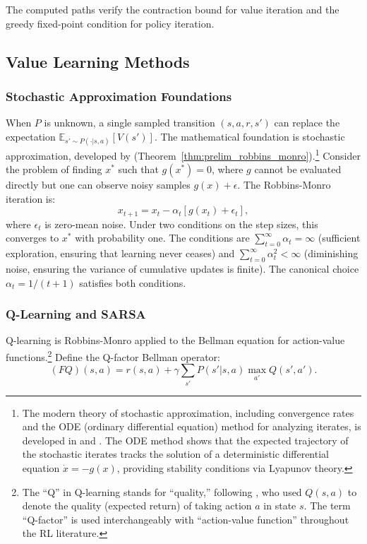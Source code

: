 The computed paths verify the contraction bound for value iteration and the greedy fixed-point condition for policy iteration.

\FloatBarrier
\subsection{Value Learning Methods}
\label{sec:stochastic_approx}

\subsubsection{Stochastic Approximation Foundations}

When $P$ is unknown, a single sampled transition $(s, a, r, s')$ can replace the expectation $\mathbb{E}_{s' \sim P(\cdot|s,a)}[V(s')]$. The mathematical foundation is stochastic approximation, developed by \citet{robbinsmonro1951} (Theorem~\ref{thm:prelim_robbins_monro}).\footnote{The modern theory of stochastic approximation, including convergence rates and the ODE (ordinary differential equation) method for analyzing iterates, is developed in \citet{kushner1978} and \citet{borkar2000}. The ODE method shows that the expected trajectory of the stochastic iterates tracks the solution of a deterministic differential equation $\dot{x} = -g(x)$, providing stability conditions via Lyapunov theory.} Consider the problem of finding $x^*$ such that $g(x^*) = 0$, where $g$ cannot be evaluated directly but one can observe noisy samples $g(x) + \epsilon$. The Robbins-Monro iteration is:
\begin{equation}
x_{t+1} = x_t - \alpha_t [g(x_t) + \epsilon_t],
\label{eq:robbins_monro}
\end{equation}
where $\epsilon_t$ is zero-mean noise. Under two conditions on the step sizes, this converges to $x^*$ with probability one. The conditions are $\sum_{t=0}^\infty \alpha_t = \infty$ (sufficient exploration, ensuring that learning never ceases) and $\sum_{t=0}^\infty \alpha_t^2 < \infty$ (diminishing noise, ensuring the variance of cumulative updates is finite). The canonical choice $\alpha_t = 1/(t+1)$ satisfies both conditions.

\subsubsection{Q-Learning and SARSA}

Q-learning \citep{WatkinsDayan1992} is Robbins-Monro applied to the Bellman equation for action-value functions.\footnote{The ``Q'' in Q-learning stands for ``quality,'' following \citet{WatkinsDayan1992}, who used $Q(s,a)$ to denote the quality (expected return) of taking action $a$ in state $s$. The term ``Q-factor'' is used interchangeably with ``action-value function'' throughout the RL literature.} Define the Q-factor Bellman operator:
\begin{equation}
(FQ)(s,a) = r(s,a) + \gamma \sum_{s'} P(s'|s,a) \max_{a'} Q(s',a').
\end{equation}

